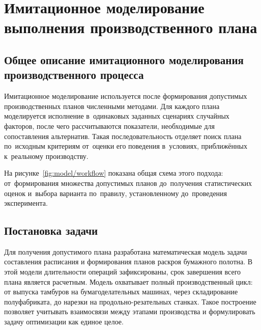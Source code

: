 \chapter{Имитационное моделирование выполнения производственного плана}\label{ch:model}
\section{Общее описание имитационного моделирования производственного процесса}\label{sec:model/workflow}

Имитационное моделирование используется после формирования допустимых производственных планов численными методами. Для каждого плана моделируется исполнение в~одинаковых заданных сценариях случайных факторов, после чего рассчитываются показатели, необходимые для сопоставления альтернатив. Такая последовательность отделяет поиск плана по~исходным критериям от~оценки его поведения в~условиях, приближённых к~реальному производству.

На рисунке~\ref{fig:model/workflow} показана общая схема этого подхода: от~формирования множества допустимых планов до~получения статистических оценок и~выбора варианта по~правилу, установленному до~проведения эксперимента.

\begin{center}
\label{fig:model/workflow}
\end{center}

\section{Постановка задачи}\label{sec:model/statement}
Для получения допустимого плана разработана математическая модель задачи составления расписания и формирования планов раскроя бумажного полотна. В этой модели длительности операций зафиксированы, срок завершения всего плана является расчетным.
Модель охватывает полный производственный цикл: от выпуска тамбуров на бумагоделательных машинах, через складирование полуфабриката, до нарезки на продольно-резательных станках.
Такое построение позволяет учитывать взаимосвязи между этапами производства и формулировать задачу оптимизации как единое целое.



